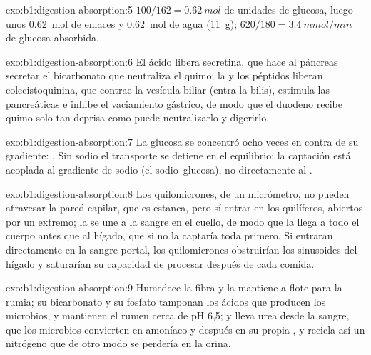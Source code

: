 \begin{solution}{exo:b1:digestion-absorption:5}
$100/162 = \qty{0.62}{mol}$ de unidades de glucosa, luego unos
\qty{0.62}{mol} de enlaces y \qty{0.62}{mol} de agua (\qty{11}{g});
$620/180 = \qty{3.4}{mmol/min}$ de glucosa absorbida.
\end{solution}

\begin{solution}{exo:b1:digestion-absorption:6}
El ácido libera secretina, que hace al páncreas secretar el bicarbonato que
neutraliza el quimo; la  y los péptidos liberan colecistoquinina, que
contrae la vesícula biliar (entra la bilis), estimula las 
pancreáticas e inhibe el vaciamiento gástrico, de modo que el duodeno recibe
quimo solo tan deprisa como puede neutralizarlo y digerirlo.
\end{solution}

\begin{solution}{exo:b1:digestion-absorption:7}
La glucosa se concentró ocho veces en contra de su gradiente: . Sin sodio el transporte se detiene en el equilibrio: la captación
está acoplada al gradiente de sodio (el  sodio--glucosa), no
directamente al .
\end{solution}

\begin{solution}{exo:b1:digestion-absorption:8}
Los quilomicrones, de un micrómetro, no pueden atravesar la pared capilar,
que es estanca, pero sí entrar en los quilíferos, abiertos por un extremo;
la  se une a la sangre en el cuello, de modo que la  llega a todo
el cuerpo antes que al hígado, que si no la captaría toda primero. Si
entraran directamente en la sangre portal, los quilomicrones obstruirían los
sinusoides del hígado y saturarían su capacidad de procesar  después de
cada comida.
\end{solution}

\begin{solution}{exo:b1:digestion-absorption:9}
Humedece la fibra y la mantiene a flote para la rumia; su bicarbonato y su
fosfato tamponan los ácidos que producen los microbios, y mantienen el rumen
cerca de pH 6,5; y lleva urea desde la sangre, que los microbios convierten
en amoníaco y después en su propia , y recicla así un nitrógeno que
de otro modo se perdería en la orina.
\end{solution}

